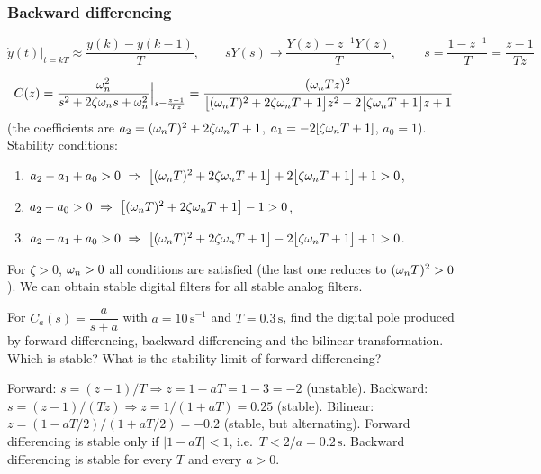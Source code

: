 \subsubsection*{Backward differencing}
\[
  \dot y(t)\Big|_{t=kT}\approx\frac{y(k)-y(k-1)}{T},\qquad sY(s)\to\frac{Y(z)-z^{-1}Y(z)}{T},\qquad
  \boxed{\,s=\frac{1-z^{-1}}{T}=\frac{z-1}{Tz}\,}
\]
\begin{example}
\[
  C(z)=\frac{\omega_n^{2}}{s^{2}+2\zeta\omega_n s+\omega_n^{2}}\Big|_{s=\frac{z-1}{Tz}}
  =\frac{(\omega_n Tz)^{2}}{\bigl[(\omega_n T)^{2}+2\zeta\omega_n T+1\bigr]z^{2}-2\bigl[\zeta\omega_n T+1\bigr]z+1}
\]
(the coefficients are $a_2=(\omega_n T)^{2}+2\zeta\omega_n T+1$, $a_1=-2[\zeta\omega_n T+1]$, $a_0=1$). Stability conditions:
\begin{enumerate}
  \item $a_2-a_1+a_0>0\ \Rightarrow\ \bigl[(\wn T)^{2}+2\zeta\wn T+1\bigr]+2\bigl[\zeta\wn T+1\bigr]+1>0$,
  \item $a_2-a_0>0\ \Rightarrow\ \bigl[(\omega_n T)^{2}+2\zeta\omega_n T+1\bigr]-1>0$,
  \item $a_2+a_1+a_0>0\ \Rightarrow\ \bigl[(\wn T)^{2}+2\zeta\wn T+1\bigr]-2\bigl[\zeta\wn T+1\bigr]+1>0$.
\end{enumerate}
For $\zeta>0$, $\omega_n>0$ all conditions are satisfied (the last one reduces to $(\omega_n T)^{2}>0$). We can obtain stable digital
filters for all stable analog filters.
\end{example}

\begin{problem}
For $C_a(s)=\dfrac{a}{s+a}$ with $a=10\,\mathrm{s^{-1}}$ and $T=0.3\,\mathrm{s}$, find the digital pole produced by
forward differencing, backward differencing and the bilinear transformation. Which is stable? What is the
stability limit of forward differencing?
\end{problem}
\begin{solution}
Forward: $s=(z-1)/T\Rightarrow z=1-aT=1-3=-2$ (unstable). Backward: $s=(z-1)/(Tz)\Rightarrow z=1/(1+aT)=0.25$
(stable). Bilinear: $z=(1-aT/2)/(1+aT/2)=-0.2$ (stable, but alternating). Forward differencing is stable only if
$|1-aT|<1$, i.e.\ $T<2/a=0.2\,\mathrm{s}$. Backward differencing is stable for every $T$ and every $a>0$.
\end{solution}


